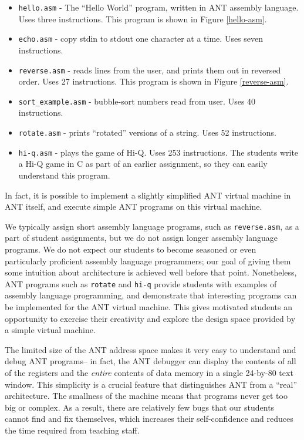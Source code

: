 \begin{itemize}

\item {\tt hello.asm} - The ``Hello World'' program, written in ANT
	assembly language. Uses three instructions.
	This program is shown in Figure \ref{hello-asm}.

\item {\tt echo.asm} - copy stdin to stdout one character at a time. 
	Uses seven instructions.

\item {\tt reverse.asm} - reads lines from the user, and prints them
	out in reversed order.  Uses 27 instructions.
	This program is shown in Figure \ref{reverse-asm}.

\item {\tt sort\_example.asm} - bubble-sort numbers read from user. 
	Uses 40 instructions.

\item {\tt rotate.asm} - prints ``rotated'' versions of a string.  Uses
	52 instructions.

\item {\tt hi-q.asm} - plays the game of Hi-Q.  Uses 253 instructions.
	The students write a Hi-Q game in C as part of an earlier
	assignment, so they can easily understand this program.

\end{itemize}

In fact, it is possible to implement a slightly simplified ANT virtual
machine in ANT itself, and execute simple ANT programs on this virtual
machine.

We typically assign short assembly language programs, such as
{\tt reverse.asm}, as a part of student assignments, but we do not assign
longer assembly language programs.  We do not expect our students to
become seasoned or even particularly proficient
assembly language programmers; our
goal of giving them some intuition about architecture is achieved well
before that point.  Nonetheless, ANT programs such as {\tt rotate} and
{\tt hi-q}
provide students with examples of assembly language programming, and
demonstrate that interesting programs can be implemented for the
ANT virtual machine.  This gives motivated students an opportunity to
exercise their creativity and explore the design space provided by a
simple virtual machine. 

The limited size of the ANT address space makes it very easy to
understand and debug ANT programs-- in fact, the ANT debugger can
display the contents of all of the registers and the {\em entire}
contents of data memory in a single 24-by-80 text window.  This
simplicity is a crucial feature that distinguishes ANT from a ``real''
architecture.  The smallness of the machine means that programs never
get too big or complex.  As a result, there are relatively few bugs
that our students cannot find and fix themselves, which increases
their self-confidence and reduces the time required from teaching
staff.

